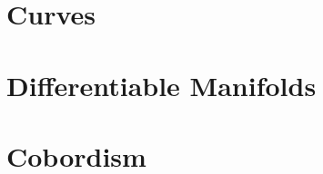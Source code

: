 \documentclass[../../../deep-dive]{subfiles}
\begin{document}
\chapter{Curves}



\chapter{Differentiable Manifolds}





% 

\chapter{Cobordism}


\end{document}
